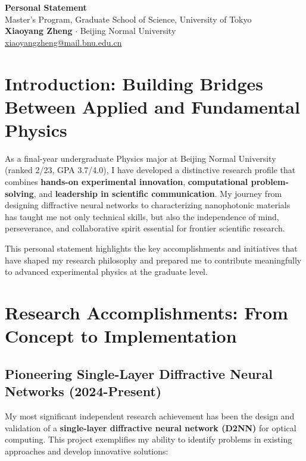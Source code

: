 \documentclass[11pt,a4paper]{article}
\begin{document}
\begin{center}
    {\Large \textbf{Personal Statement}}\\[0.4em]
    {\large Master's Program, Graduate School of Science, University of Tokyo}\\[0.8em]
    \textbf{Xiaoyang Zheng} $\cdot$ Beijing Normal University\\
    \href{mailto:xiaoyangzheng@mail.bnu.edu.cn}{xiaoyangzheng@mail.bnu.edu.cn}
\end{center}

\vspace{-0.3em}

\section{Introduction: Building Bridges Between Applied and Fundamental Physics}

As a final-year undergraduate Physics major at Beijing Normal University (ranked 2/23, GPA 3.7/4.0), I have developed a distinctive research profile that combines \textbf{hands-on experimental innovation}, \textbf{computational problem-solving}, and \textbf{leadership in scientific communication}. My journey from designing diffractive neural networks to characterizing nanophotonic materials has taught me not only technical skills, but also the independence of mind, perseverance, and collaborative spirit essential for frontier scientific research.

This personal statement highlights the key accomplishments and initiatives that have shaped my research philosophy and prepared me to contribute meaningfully to advanced experimental physics at the graduate level.

\section{Research Accomplishments: From Concept to Implementation}

\subsection{Pioneering Single-Layer Diffractive Neural Networks (2024-Present)}

My most significant independent research achievement has been the design and validation of a \textbf{single-layer diffractive neural network (D2NN)} for optical computing. This project exemplifies my ability to identify problems in existing approaches and develop innovative solutions:
\end{document}
